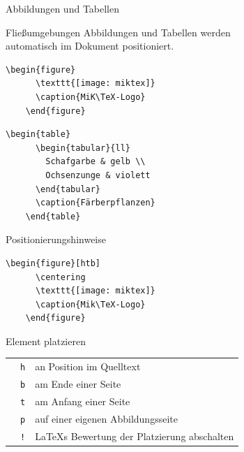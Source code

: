 \begin{Frame}[fragile]{Abbildungen und Tabellen}
  \begin{Block}{Fließumgebungen}
    Abbildungen und Tabellen werden\\
    automatisch im Dokument positioniert.
  \end{Block}

  \begin{lstlisting}[gobble=4]
    \begin{figure}
      \texttt{[image: miktex]}
      \caption{MiK\TeX-Logo}
    \end{figure}
  \end{lstlisting}

  \begin{lstlisting}[gobble=4]
    \begin{table}
      \begin{tabular}{ll}
        Schafgarbe & gelb \\
        Ochsenzunge & violett
      \end{tabular}
      \caption{Färberpflanzen}
    \end{table}
  \end{lstlisting}
\end{Frame}

\begin{Frame}[fragile]{Positionierungshinweise}
  \begin{lstlisting}[gobble=4]
    \begin{figure}[htb]
      \centering
      \texttt{[image: miktex]}
      \caption{Mik\TeX-Logo}
    \end{figure}
  \end{lstlisting}

  \xxx

  Element platzieren
  
  \begin{tabular}{lr@{ }l}
    & \lstinline-h- & an Position im Quelltext \\
    & \lstinline-b- & am Ende einer Seite \\
    & \lstinline-t- & am Anfang einer Seite \\
    & \lstinline-p- & auf einer eigenen Abbildungsseite \\
    & \lstinline-!- & \LaTeX s Bewertung der Platzierung abschalten
  \end{tabular}
\end{Frame}

